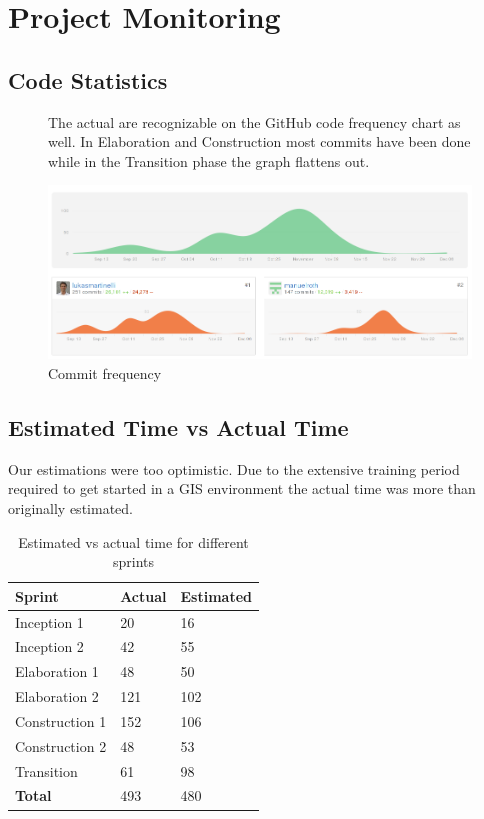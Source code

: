\chapter{Project Monitoring}\label{project monitoring}

\section{Code Statistics}

\begin{figure}[H]

The actual  are recognizable on the GitHub code frequency chart as well. In Elaboration and Construction most commits have been done while in the Transition phase the graph flattens out.

  \centering
  \includegraphics[width=1\textwidth]{images/github_commits.png}
  \caption{Commit frequency}
\end{figure}

\section{Estimated Time vs Actual Time}

Our estimations were too optimistic. Due to the extensive
training period required to get started in a GIS environment
the actual time was more than originally estimated.


\begin{table}[H]
\centering
    \begin{tabular}{lll}
    \textbf{Sprint}        & \textbf{Actual} & \textbf{Estimated} \\
     \hline
    Inception 1    & 20     & 16        \\
    Inception 2    & 42     & 55        \\
    Elaboration 1  & 48     & 50        \\
    Elaboration 2  & 121    & 102       \\
    Construction 1 & 152    & 106         \\
    Construction 2 & 48     & 53        \\
    Transition     & 61 & 98        \\
    \hline
    \textbf{Total}          & 493 & 480 \\
    \end{tabular}
    \caption{Estimated vs actual time for different sprints}
\end{table}
\newpage

